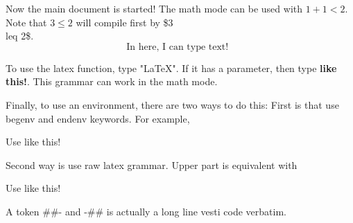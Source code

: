 \documentclass[item,korean]{coprime}
\begin{document}
Now the main document is started! The math mode can be used with $1+1<2$.
Note that $3\leq 2$ will compile first by \$3\\leq 2\$.
\[
    \text{In here, I can type text! }
\]

To use the latex function, type "LaTeX". If it has a parameter,
then type \textbf{like this!}. This grammar can work in the math mode.

Finally, to use an environment, there are two ways to do this:
First is that use begenv and endenv keywords. For example,

\begin{center}
    \begin{minipage}{0.7\textwidth}
        Use like this!
    \end{minipage}
\end{center}

Second way is use raw latex grammar. Upper part is equivalent with

\begin{center}
    \begin{minipage}{0.7\textwidth}
        Use like this!
    \end{minipage}
\end{center}

A token \#\#- and -\#\# is actually a long line vesti code verbatim.
\end{document}
